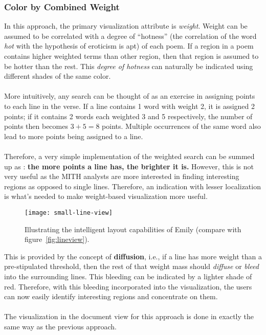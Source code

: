 \documentclass[10pt, twocolumn]{article}
\begin{document}
 \subsubsection{Color by Combined Weight}
 In this approach, the primary visualization attribute is \textit{weight}. Weight can be assumed to be correlated with a degree of ``hotness'' (the correlation of the word \textit{hot} with the hypothesis of eroticism is apt) of each poem. If a region in a poem contains higher weighted terms than other region, then that region is assumed to be hotter than the rest. This \textit{degree of hotness} can naturally be indicated using different shades of the same color. \\ \\ 
 More intuitively, any search can be thought of as an exercise in assigning points to each line in the verse. If a line contains 1 word with weight 2, it is assigned 2 points; if it contains 2 words each weighted 3 and 5 respectively, the number of points then becomes $3+5 = 8$ points. Multiple occurrences of the same word also lead to more points being assigned to a line. \\ \\
 Therefore, a very simple implementation of the weighted search can be summed up as : \textbf{the more points a line has, the brighter it is.} However, this is not very useful as the MITH analysts are more interested in finding interesting regions as opposed to single lines. Therefore, an indication with lesser localization is what's needed to make weight-based visualization more useful. 
  \begin{figure*}
\begin{center}
\texttt{[image: small-line-view]} 
\end{center}
\caption{Illustrating the intelligent layout capabilities of Emily (compare with figure~\ref{fig:lineview}).} \label{fig:small-line-view}
\end{figure*}
  This is provided by the concept of \textbf{diffusion}, i.e., if a line has more weight than a pre-stipulated threshold, then the rest of that weight mass should \textit{diffuse} or \textit{bleed} into the surrounding lines. This bleeding can be indicated by a lighter shade of red. Therefore, with this bleeding incorporated into the visualization, the users can now easily identify interesting regions and concentrate on them. \\ \\
The visualization in the document view for this approach is done in exactly the same way as the previous approach. 
\end{document}
